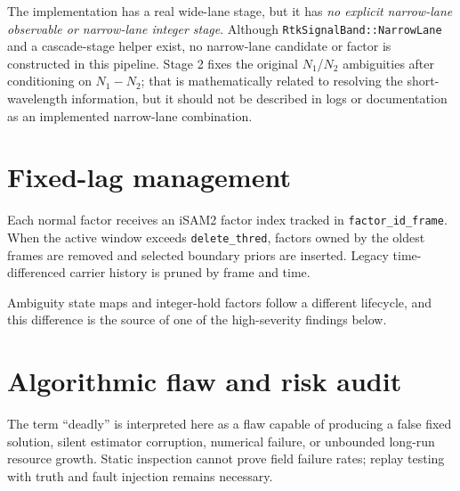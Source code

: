 \documentclass[11pt,a4paper]{article}
\newcommand{\code}[1]{\texttt{#1}}
\begin{document}
The implementation has a real wide-lane stage, but it has \emph{no explicit
narrow-lane observable or narrow-lane integer stage}.  Although
\code{RtkSignalBand::NarrowLane} and a cascade-stage helper exist, no narrow-lane
candidate or factor is constructed in this pipeline.  Stage 2 fixes the original
$N_1$/$N_2$ ambiguities after conditioning on $N_1-N_2$; that is mathematically
related to resolving the short-wavelength information, but it should not be
described in logs or documentation as an implemented narrow-lane combination.

\section{Fixed-lag management}

Each normal factor receives an iSAM2 factor index tracked in
\code{factor\_id\_frame}.  When the active window exceeds
\code{delete\_thred}, factors owned by the oldest frames are removed and
selected boundary priors are inserted.  Legacy time-differenced carrier history
is pruned by frame and time.

Ambiguity state maps and integer-hold factors follow a different lifecycle, and
this difference is the source of one of the high-severity findings below.

\section{Algorithmic flaw and risk audit}

The term ``deadly'' is interpreted here as a flaw capable of producing a false
fixed solution, silent estimator corruption, numerical failure, or unbounded
long-run resource growth.  Static inspection cannot prove field failure rates;
replay testing with truth and fault injection remains necessary.
\end{document}
